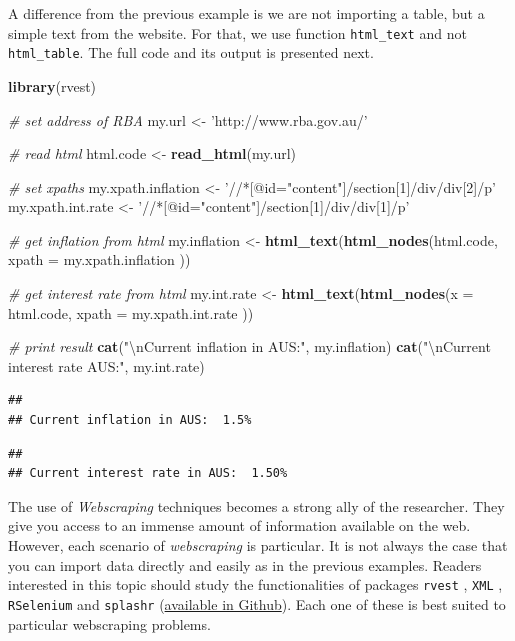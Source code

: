 \documentclass[11pt,]{book}
\newenvironment{Shaded}{\begin{snugshade}}{\end{snugshade}}
\newcommand{\KeywordTok}[1]{\textcolor[rgb]{0.27,0.27,0.27}{\textbf{#1}}}
\newcommand{\DataTypeTok}[1]{\textcolor[rgb]{0.27,0.27,0.27}{#1}}
\newcommand{\CharTok}[1]{\textcolor[rgb]{0.5,0.5,0.5}{#1}}
\newcommand{\StringTok}[1]{\textcolor[rgb]{0.5,0.5,0.5}{#1}}
\newcommand{\CommentTok}[1]{\textcolor[rgb]{0.56,0.35,0.01}{\textit{#1}}}
\newcommand{\NormalTok}[1]{#1}
\begin{document}
A difference from the previous example is we are not importing a table,
but a simple text from the website. For that, we use function
\texttt{html\_text} and not \texttt{html\_table}. The full code and its
output is presented next.

\begin{Shaded}
\begin{Highlighting}[]
\KeywordTok{library}\NormalTok{(rvest)}

\CommentTok{# set address of RBA}
\NormalTok{my.url <-}\StringTok{ 'http://www.rba.gov.au/'}

\CommentTok{# read html}
\NormalTok{html.code <-}\StringTok{ }\KeywordTok{read_html}\NormalTok{(my.url)}

\CommentTok{# set xpaths}
\NormalTok{my.xpath.inflation <-}\StringTok{ '//*[@id="content"]/section[1]/div/div[2]/p'}
\NormalTok{my.xpath.int.rate <-}\StringTok{ '//*[@id="content"]/section[1]/div/div[1]/p'}

\CommentTok{# get inflation from html}
\NormalTok{my.inflation <-}\StringTok{ }\KeywordTok{html_text}\NormalTok{(}\KeywordTok{html_nodes}\NormalTok{(html.code,}
                                     \DataTypeTok{xpath =}\NormalTok{ my.xpath.inflation ))}

\CommentTok{# get interest rate from html}
\NormalTok{my.int.rate <-}\StringTok{ }\KeywordTok{html_text}\NormalTok{(}\KeywordTok{html_nodes}\NormalTok{(}\DataTypeTok{x =}\NormalTok{ html.code,}
                                   \DataTypeTok{xpath =}\NormalTok{ my.xpath.int.rate ))}

\CommentTok{# print result}
\KeywordTok{cat}\NormalTok{(}\StringTok{"}\CharTok{\textbackslash{}n}\StringTok{Current inflation in AUS:"}\NormalTok{, my.inflation)}
\KeywordTok{cat}\NormalTok{(}\StringTok{"}\CharTok{\textbackslash{}n}\StringTok{Current interest rate AUS:"}\NormalTok{, my.int.rate)}
\end{Highlighting}
\end{Shaded}

\begin{verbatim}
## 
## Current inflation in AUS:  1.5%
\end{verbatim}

\begin{verbatim}
## 
## Current interest rate in AUS:  1.50%
\end{verbatim}

The use of \emph{Webscraping} techniques becomes a strong ally of the
researcher. They give you access to an immense amount of information
available on the web. However, each scenario of \emph{webscraping} is
particular. It is not always the case that you can import data directly
and easily as in the previous examples. Readers interested in this topic
should study the functionalities of packages \texttt{rvest}
\citep{rvest}, \texttt{XML} \citep{XML}, \texttt{RSelenium}
\citep{RSelenium} and \texttt{splashr}
(\href{https://github.com/hrbrmstr/splashr}{available in Github}). Each
one of these is best suited to particular webscraping problems.
   
\end{document}

